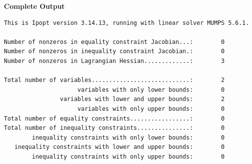 \textbf{Complete Output} 
\begin{verbatim}
This is Ipopt version 3.14.13, running with linear solver MUMPS 5.6.1.

Number of nonzeros in equality constraint Jacobian...:        0
Number of nonzeros in inequality constraint Jacobian.:        0
Number of nonzeros in Lagrangian Hessian.............:        3

Total number of variables............................:        2
                     variables with only lower bounds:        0
                variables with lower and upper bounds:        2
                     variables with only upper bounds:        0
Total number of equality constraints.................:        0
Total number of inequality constraints...............:        0
        inequality constraints with only lower bounds:        0
   inequality constraints with lower and upper bounds:        0
        inequality constraints with only upper bounds:        0


\end{verbatim}
